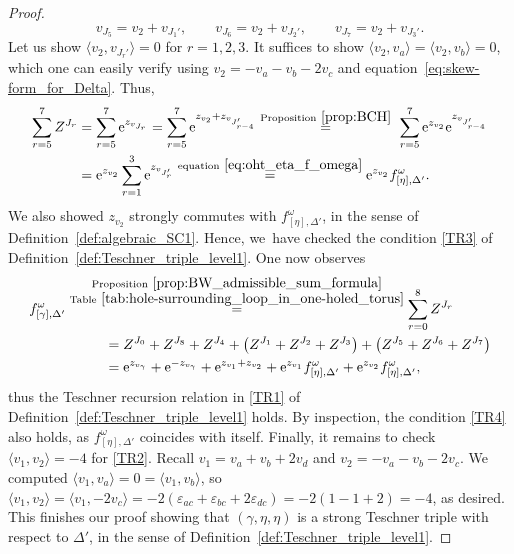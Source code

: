 \documentclass[10pt,a4paper]{amsart}
\numberwithin{equation}{section}
\theoremstyle{definition}
\begin{document}
\begin{proof}
\[
v_{J_5} = v_2 + v_{J_1'}, \qquad
v_{J_6} = v_2 + v_{J_2'}, \qquad
v_{J_7} = v_2 + v_{J_3'}.
\]
Let us show $\langle v_2, v_{J_r'} \rangle=0$ for $r=1,2,3$. It suffices to show $\langle v_2,v_a\rangle = \langle v_2,v_b \rangle=0$, which one can easily verify using $v_2 = -v_a-v_b-2v_c$ and equation~\eqref{eq:skew-form_for_Delta}. Thus,
\begin{align*}\begin{split}
\sum_{r=5}^{7} Z^{J_r} & = \sum_{r=5}^{7} {\rm e}^{z_{v_{J_r}}}
= \sum_{r=5}^{7} {\rm e}^{z_{v_2} + z_{v_{J_{r-4}'}}}
 \stackrel{{\rm Proposition}~\ref{prop:BCH}}{=}~
\sum_{r=5}^{7} {\rm e}^{z_{v_2}} {\rm e}^{z_{v_{J_{r-4}'}}} \\
 & = {\rm e}^{z_{v_2}} \sum_{r=1}^{3} {\rm e}^{z_{v_{J_r'}}}
 \stackrel{{\rm equation}~\eqref{eq:oht_eta_f_omega}}{=}
{\rm e}^{z_{v_2}} f^\omega_{[\eta],\Delta'}.
\end{split}
\end{align*}
We also showed $z_{v_2}$ strongly commutes with $f^\omega_{[\eta],\Delta'}$, in the sense of Definition~\ref{def:algebraic_SC1}. Hence, we~have checked the condition \ref{TR3} of Definition~\ref{def:Teschner_triple_level1}.
One now observes
\begin{align*}
& f^\omega_{[\gamma],\Delta'}
\stackrel{\substack{{\rm Proposition}~\ref{prop:BW_admissible_sum_formula} \\ {\rm Table}~\ref{tab:hole-surrounding_loop_in_one-holed_torus}}}{=}
\sum_{r=0}^{8} Z^{J_r} \\
& \hspace{19mm} = Z^{J_0} + Z^{J_8} + Z^{J_4} + \bigl(Z^{J_1}+Z^{J_2}+Z^{J_3}\bigr) + \bigl(Z^{J_5}+Z^{J_6}+Z^{J_7}\bigr) \\
& \hspace{19mm} = {\rm e}^{z_{v_\gamma}} + {\rm e}^{-z_{v_\gamma}} + {\rm e}^{z_{v_1} + z_{v_2}}
+ {\rm e}^{z_{v_1}} f^\omega_{[\eta],\Delta'} + {\rm e}^{z_{v_2}} f^\omega_{[\eta],\Delta'},
\end{align*}
thus the Teschner recursion relation in \ref{TR1} of Definition~\ref{def:Teschner_triple_level1} holds. By inspection, the condition \ref{TR4} also holds, as $f^\omega_{[\eta],\Delta'}$ coincides with itself.
Finally, it remains to check $\langle v_1,v_2\rangle=-4$ for \ref{TR2}. Recall $v_1 = v_a + v_b + 2v_d$ and $v_2 = -v_a-v_b-2v_c$. We computed $\langle v_1, v_a\rangle = 0 = \langle v_1, v_b\rangle$, so $\langle v_1,v_2 \rangle = \langle v_1, -2v_c\rangle = -2( \varepsilon_{ac} + \varepsilon_{bc} + 2\varepsilon_{dc}) = -2(1 - 1 + 2) = -4$, as desired.
This finishes our proof showing that $(\gamma,\eta,\eta)$ is a strong Teschner triple with respect to $\Delta'$, in the sense of Definition~\ref{def:Teschner_triple_level1}.
\end{proof}
\end{document}
